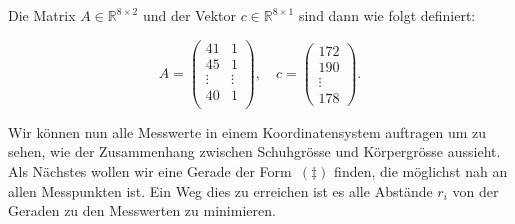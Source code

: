\vspace{1\baselineskip}

Die Matrix \( A \in \mathbb{R}^{8 \times 2} \) und der Vektor \( c \in \mathbb{R}^{8 \times 1} \) sind dann wie folgt definiert:

\begin{equation*}
    A = \begin{pmatrix}
        41 & 1 \\
        45 & 1 \\
        \vdots & \vdots \\
        40 & 1 \\
    \end{pmatrix}, \quad
    c = \begin{pmatrix}
        172 \\ 190 \\ \vdots \\ 178
    \end{pmatrix}.
\end{equation*}


\vspace{1\baselineskip}

Wir können nun alle Messwerte in einem Koordinatensystem auftragen um zu sehen, wie der Zusammenhang zwischen Schuhgrösse und Körpergrösse aussieht. Als Nächstes wollen wir eine Gerade der Form~\( (\ddagger) \) finden, die möglichst nah an allen Messpunkten ist. Ein Weg dies zu erreichen ist es alle Abstände \( r_i \) von der Geraden zu den Messwerten zu minimieren. 

\vspace{1\baselineskip}

